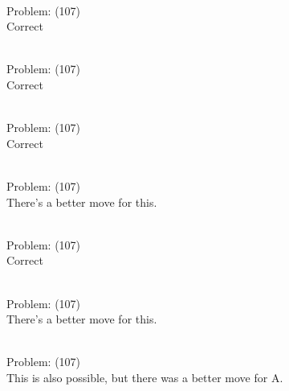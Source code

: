 \documentclass[11pt]{article}
\begin{document}
\begin{minipage}[t]{0.5\textwidth}
  {\centering
  
\\
Problem: (107)\\
Correct\\
  }
\end{minipage}
\begin{minipage}[t]{0.5\textwidth}
  {\centering
  
\\
Problem: (107)\\
Correct\\
  }
\end{minipage}
\begin{minipage}[t]{0.5\textwidth}
  {\centering
  
\\
Problem: (107)\\
Correct\\
  }
\end{minipage}
\begin{minipage}[t]{0.5\textwidth}
  {\centering
  
\\
Problem: (107)\\
There's a better move for this.\\
  }
\end{minipage}
\begin{minipage}[t]{0.5\textwidth}
  {\centering
  
\\
Problem: (107)\\
Correct\\
  }
\end{minipage}
\begin{minipage}[t]{0.5\textwidth}
  {\centering
  
\\
Problem: (107)\\
There's a better move for this.\\
  }
\end{minipage}
\begin{minipage}[t]{0.5\textwidth}
  {\centering
  
\\
Problem: (107)\\
This is also possible, but there was a better move for A.\\
  }
\end{minipage}
\end{document}

